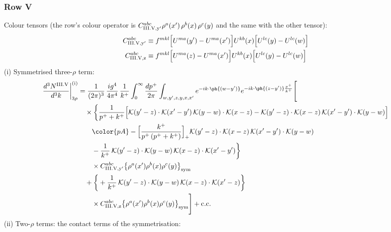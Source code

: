 \subsubsection*{Row V}
Colour tensors (the row's colour operator is $C^{abc}_{{\rm III.V,y'}}\rho^{a}(x')\,\rho^{b}(x)\,\rho^{c}(y)$ and the same with the other tensor):
\begin{align}
C^{abc}_{{\rm III.V,y'}}&\equiv f^{mkl}\Big[U^{ma}(y')-U^{ma}(x')\Big]U^{kb}(x)\Big[U^{lc}(y)-U^{lc}(w)\Big]\notag\\
C^{abc}_{{\rm III.V,z}}&\equiv f^{mkl}\Big[U^{ma}(z)-U^{ma}(x')\Big]U^{kb}(x)\Big[U^{lc}(y)-U^{lc}(w)\Big]\notag
\end{align}
(i) Symmetrised three-$\rho$ term:
\begin{align}
\frac{d^{3}N^{\rm III.V}}{d^{3}k}\bigg|^{\rm (i)}_{3\rho}&=\frac{1}{(2\pi)^{3}}\,\frac{ig^{4}}{4\pi^{4}}\,\frac{1}{k^{+}}\int_{0}^{\infty}\frac{dp^{+}}{2\pi}\int_{w,y',z,y,x,x'}e^{-ik\cdot\ph{(w-y')}}e^{-ik\cdot\ph{(z-y')}\frac{p^{+}}{k^{+}}}\Bigg[\notag\\
&\quad\times\bigg\{\frac{1}{p^{+}+k^{+}}\Big[\mathcal{K}(y'-z)\cdot\mathcal{K}(x'-y')\,\mathcal{K}(y-w)\cdot\mathcal{K}(x-z)-\mathcal{K}(y'-z)\cdot\mathcal{K}(x-z)\,\mathcal{K}(x'-y')\cdot\mathcal{K}(y-w)\Big]\notag\\
&\qquad{\color{pA}-\Big[\frac{k^{+}}{p^{+}\,(p^{+}+k^{+})}\Big]_{+}\mathcal{K}(y'-z)\cdot\mathcal{K}(x-z)\,\mathcal{K}(x'-y')\cdot\mathcal{K}(y-w)}\notag\\
&\qquad-\frac{1}{k^{+}}\,\mathcal{K}(y'-z)\cdot\mathcal{K}(y-w)\,\mathcal{K}(x-z)\cdot\mathcal{K}(x'-y')\bigg\}\notag\\
&\qquad\times C^{abc}_{{\rm III.V,y'}}\big\{\rho^{a}(x')\rho^{b}(x)\rho^{c}(y)\big\}_{\rm sym}\notag\\
&\quad+\bigg\{+\frac{1}{k^{+}}\,\mathcal{K}(y'-z)\cdot\mathcal{K}(y-w)\,\mathcal{K}(x-z)\cdot\mathcal{K}(x'-z)\bigg\}\notag\\
&\qquad\times C^{abc}_{{\rm III.V,z}}\big\{\rho^{a}(x')\rho^{b}(x)\rho^{c}(y)\big\}_{\rm sym}\Bigg]+{\rm c.c.}\label{eq:D-III.V-3}
\end{align}
(ii) Two-$\rho$ terms: the contact terms of the symmetrisation:
